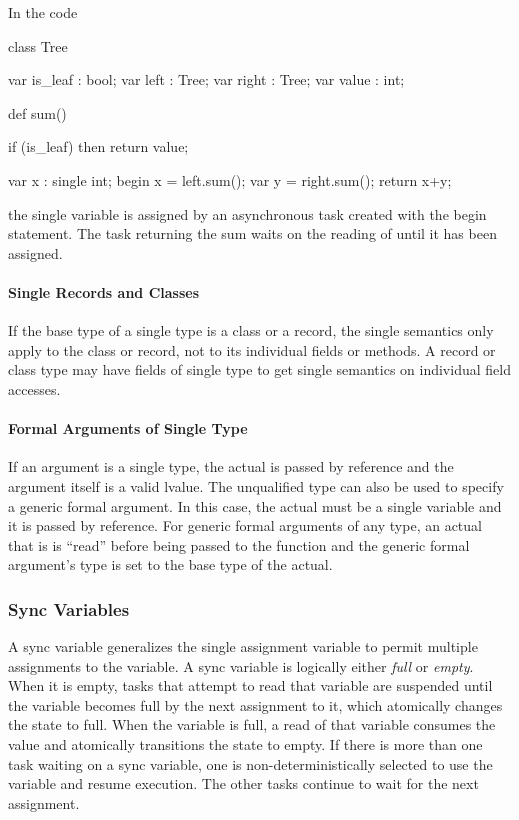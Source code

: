 \begin{example}
In the code
\begin{chapel}
class Tree {
  var is_leaf : bool;
  var left    : Tree;
  var right   : Tree;
  var value   : int;

  def sum() {
    if (is_leaf) then 
       return value;

    var x : single int;
    begin x = left.sum();
    var y = right.sum();
    return x+y;
  }
}
\end{chapel}
the single variable  is assigned by an asynchronous task
created with the begin statement.  The task returning the sum waits on
the reading of  until it has been assigned.
\end{example}

\paragraph{Single Records and Classes}
If the base type of a single type is a class or a record, the single
semantics only apply to the class or record, not to its individual
fields or methods.  A record or class type may have fields of single
type to get single semantics on individual field accesses.

\paragraph{Formal Arguments of Single Type}
If an argument is a single type, the actual is passed by reference and
the argument itself is a valid lvalue.  The unqualified
type  can also be used to specify a generic formal
argument.  In this case, the actual must be a single variable and it
is passed by reference.  For generic formal arguments of any type, an
actual that is  is ``read'' before being passed to the
function and the generic formal argument's type is set to the base
type of the actual.

\subsubsection{Sync Variables}
\label{Sync_Variables}

A sync variable generalizes the single assignment variable to permit
multiple assignments to the variable.  A sync variable is logically
either {\em full} or {\em empty}.  When it is empty, tasks that
attempt to read that variable are suspended until the variable becomes
full by the next assignment to it, which atomically changes the state
to full.  When the variable is full, a read of that variable consumes
the value and atomically transitions the state to empty.  If there is
more than one task waiting on a sync variable, one is
non-deterministically selected to use the variable and resume
execution.  The other tasks continue to wait for the next assignment.

